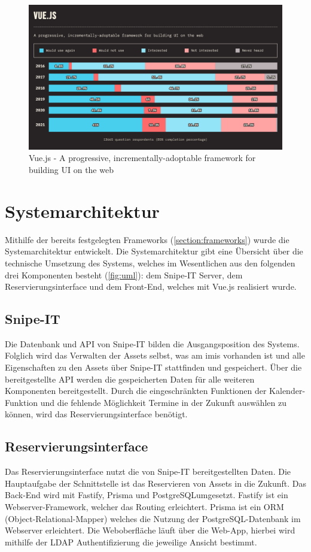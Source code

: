 \begin{figure}[h]
    \centering
    \includegraphics[scale=0.22]{Bilder/vuejs.png}
    \caption[Vue.js A progressive, incrementally-adoptable framework for building UI on the web]{Vue.js - A progressive, incrementally-adoptable framework for building UI on the web}
    \label{fig:vue}
\end{figure}


\section{Systemarchitektur}
Mithilfe der bereits festgelegten Frameworks (\ref{section:frameworks}) wurde die Systemarchitektur
entwickelt. Die Systemarchitektur gibt eine Übersicht über die technische Umsetzung des Systems,
welches im Wesentlichen aus den folgenden drei Komponenten besteht (\ref{fig:uml}): dem Snipe-IT
Server, dem Reservierungsinterface und dem Front-End, welches mit Vue.js realisiert wurde.

\subsection{Snipe-IT}
Die Datenbank und API von Snipe-IT bilden die Ausgangsposition des Systems. Folglich wird das
Verwalten der Assets selbst, was am \ac{imis} vorhanden ist und alle Eigenschaften zu den Assets
über Snipe-IT stattfinden und gespeichert. Über die bereitgestellte API werden die gespeicherten
Daten für alle weiteren Komponenten bereitgestellt. Durch die eingeschränkten Funktionen der
Kalender-Funktion und die fehlende Möglichkeit Termine in der Zukunft auswählen zu können, wird das
Reservierungsinterface benötigt.

\subsection{Reservierungsinterface}
Das Reservierungsinterface nutzt die von Snipe-IT bereitgestellten Daten. Die Hauptaufgabe der
Schnittstelle ist das Reservieren von Assets in die Zukunft. Das Back-End wird mit Fastify, Prisma
und PostgreSQLumgesetzt. Fastify ist ein Webserver-Framework, welcher das Routing erleichtert.
Prisma ist ein ORM (Object-Relational-Mapper) welches die Nutzung der PostgreSQL-Datenbank im
Webserver erleichtert. Die Weboberfläche läuft über die Web-App, hierbei wird mithilfe der LDAP
Authentifizierung die jeweilige Ansicht bestimmt.

